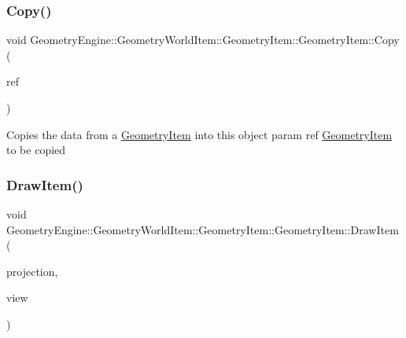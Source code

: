 \mbox{\label{class_geometry_engine_1_1_geometry_world_item_1_1_geometry_item_1_1_geometry_item_a13a2a225acb39c559601c2151b4322bf}} 
\subsubsection{\texorpdfstring{Copy()}{Copy()}}
{\footnotesize\ttfamily void Geometry\+Engine\+::\+Geometry\+World\+Item\+::\+Geometry\+Item\+::\+Geometry\+Item\+::\+Copy (\begin{DoxyParamCaption}\item[{const \mbox{\hyperlink{class_geometry_engine_1_1_geometry_world_item_1_1_geometry_item_1_1_geometry_item}{Geometry\+Item}} \&}]{ref }\end{DoxyParamCaption})\hspace{0.3cm}{\ttfamily [virtual]}}

Copies the data from a \mbox{\hyperlink{class_geometry_engine_1_1_geometry_world_item_1_1_geometry_item_1_1_geometry_item}{Geometry\+Item}} into this object param ref \mbox{\hyperlink{class_geometry_engine_1_1_geometry_world_item_1_1_geometry_item_1_1_geometry_item}{Geometry\+Item}} to be copied \mbox{\label{class_geometry_engine_1_1_geometry_world_item_1_1_geometry_item_1_1_geometry_item_a263a106b8c225c7e30f2788fb4a3e4bc}} 
\subsubsection{\texorpdfstring{DrawItem()}{DrawItem()}}
{\footnotesize\ttfamily void Geometry\+Engine\+::\+Geometry\+World\+Item\+::\+Geometry\+Item\+::\+Geometry\+Item\+::\+Draw\+Item (\begin{DoxyParamCaption}\item[{const Q\+Matrix4x4 \&}]{projection,  }\item[{const Q\+Matrix4x4 \&}]{view }\end{DoxyParamCaption})\hspace{0.3cm}{\ttfamily [virtual]}}

